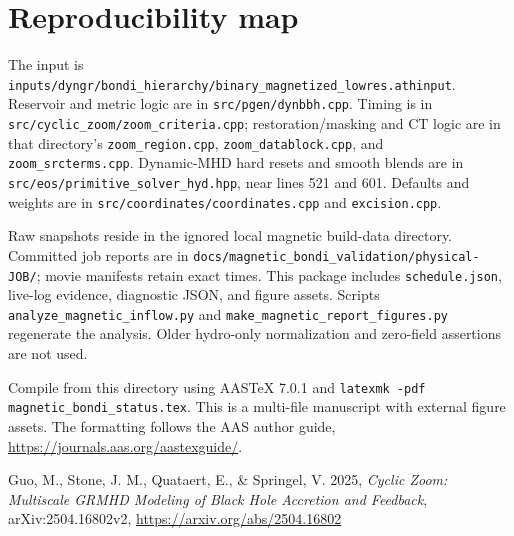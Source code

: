 \documentclass[twocolumn,anonymous]{aastex701}
\begin{document}
\clearpage
\appendix
\section{Reproducibility map}
The input is \texttt{inputs/dyngr/bondi\_hierarchy/binary\_magnetized\_lowres.athinput}. Reservoir and metric logic are in \texttt{src/pgen/dynbbh.cpp}. Timing is in \texttt{src/cyclic\_zoom/zoom\_criteria.cpp}; restoration/masking and CT logic are in that directory's \texttt{zoom\_region.cpp}, \texttt{zoom\_datablock.cpp}, and \texttt{zoom\_srcterms.cpp}. Dynamic-MHD hard resets and smooth blends are in \texttt{src/eos/primitive\_solver\_hyd.hpp}, near lines 521 and 601. Defaults and weights are in \texttt{src/coordinates/coordinates.cpp} and \texttt{excision.cpp}.

Raw snapshots reside in the ignored local magnetic build-data directory. Committed job reports are in \texttt{docs/magnetic\_bondi\_validation/physical-JOB/}; movie manifests retain exact times. This package includes \texttt{schedule.json}, live-log evidence, diagnostic JSON, and figure assets. Scripts \texttt{analyze\_magnetic\_inflow.py} and \texttt{make\_magnetic\_report\_figures.py} regenerate the analysis. Older hydro-only normalization and zero-field assertions are not used.

Compile from this directory using AASTeX 7.0.1 and \texttt{latexmk -pdf magnetic\_bondi\_status.tex}. This is a multi-file manuscript with external figure assets. The formatting follows the AAS author guide, \url{https://journals.aas.org/aastexguide/}.

\begin{thebibliography}{}
 Guo, M., Stone, J. M., Quataert, E., \& Springel, V. 2025, \emph{Cyclic Zoom: Multiscale GRMHD Modeling of Black Hole Accretion and Feedback}, arXiv:2504.16802v2, \url{https://arxiv.org/abs/2504.16802}
\end{thebibliography}
\end{document}
